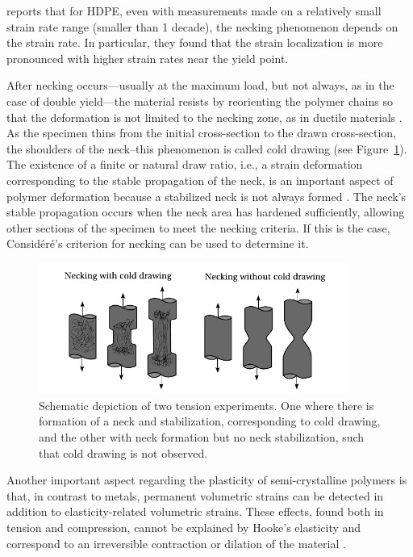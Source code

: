 \cite{yeKinematicStudyNecking2015} reports that for HDPE, even with measurements made on a relatively small strain rate range (smaller than 1 decade), the necking phenomenon depends on the strain rate.
In particular, they found that the strain localization is more pronounced with higher strain rates near the yield point.

After necking occurs—usually at the maximum load, but not always, as in the case of double yield—the material resists by reorienting the polymer chains so that the deformation is not limited to the necking zone, as in ductile materials \citep{callister2014materials}.
As the specimen thins from the initial cross-section to the drawn cross-section, the shoulders of the neck--this phenomenon is called cold drawing (see Figure~\ref{fig:natural_draw_ratio}).
The existence of a finite or natural draw ratio, i.e., a strain deformation corresponding to the stable propagation of the neck, is an important aspect of polymer deformation because a stabilized neck is not always formed \citep{wardIntroductionMechanicalProperties2004}.
The neck's stable propagation occurs when the neck area has hardened sufficiently, allowing other sections of the specimen to meet the necking criteria.
If this is the case, Considéré's criterion for necking can be used to determine it.
\begin{figure}[hbtp]
    \centering
    \includegraphics[width=0.9\textwidth]{figures/natural_draw_ratio}
    \caption{Schematic depiction of two tension experiments. One where there is formation of a neck and stabilization, corresponding to cold drawing, and the other with neck formation but no neck stabilization, such that cold drawing is not observed.}
\label{fig:natural_draw_ratio}
\end{figure}

Another important aspect regarding the plasticity of semi-crystalline polymers is that, in contrast to metals, permanent volumetric strains can be detected in addition to elasticity-related volumetric strains.
These effects, found both in tension and compression, cannot be explained by Hooke's elasticity and correspond to an irreversible contraction or dilation of the material \citep{cangemiTwoPhaseModelMechanical2001,polanco-loriaConstitutiveModelThermoplastics2010}.

